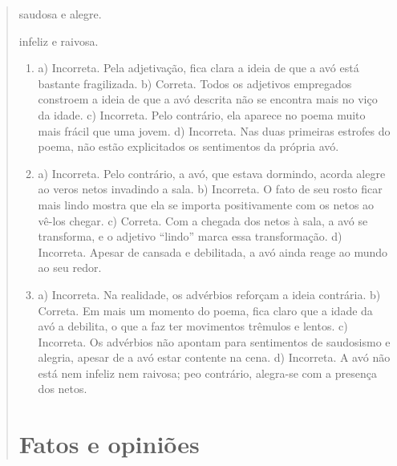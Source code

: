 \begin{quote}
\begin{escolha}
\item saudosa e alegre.

\item infeliz e raivosa.
\end{escolha}



\begin{enumerate}
\item
a) Incorreta. Pela adjetivação, fica clara a ideia de que a avó está bastante fragilizada.
b) Correta. Todos os adjetivos empregados constroem a ideia de que a avó descrita não se encontra mais no viço da idade.
c) Incorreta. Pelo contrário, ela aparece no poema muito mais frácil que uma jovem.
d) Incorreta. Nas duas primeiras estrofes do poema, não estão explicitados os sentimentos da própria avó.

\item
a) Incorreta. Pelo contrário, a avó, que estava dormindo, acorda alegre ao veros netos invadindo a sala.
b) Incorreta. O fato de seu rosto ficar mais lindo mostra que ela se importa positivamente com os netos ao vê-los chegar.
c) Correta. Com a chegada dos netos à sala, a avó se transforma, e o adjetivo “lindo” marca essa transformação.
d) Incorreta. Apesar de cansada e debilitada, a avó ainda reage ao mundo ao seu redor.

\item
a) Incorreta. Na realidade, os advérbios reforçam a ideia contrária.
b) Correta. Em mais um momento do poema, fica claro que a idade da avó a debilita, o que a faz ter movimentos trêmulos e lentos.
c) Incorreta. Os advérbios não apontam para sentimentos de saudosismo e alegria, apesar de a avó estar contente na cena.
d) Incorreta. A avó não está nem infeliz nem raivosa; peo contrário, alegra-se com a presença dos netos.

\end{enumerate}

\chapter{Fatos e opiniões}



\end{quote}

